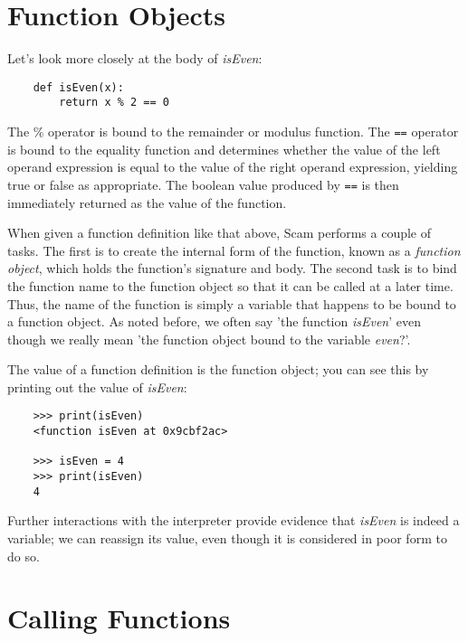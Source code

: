 \section{Function Objects}

Let's look more closely at the body of {\it isEven}:

\begin{verbatim}
    def isEven(x):
        return x % 2 == 0
\end{verbatim}

The \% operator is bound to the remainder or modulus
function. The {\tt ==} operator is bound to the equality function
and determines whether the value of the left operand
expression is equal to the value of the right operand
expression, yielding true or false as appropriate. The
{\sc boolean} value produced by {\tt ==} is then immediately returned as the
value of the function.

When given a function definition like that above, Scam
performs a couple of tasks. The first is to create the
internal form of the function, known as a {\it function object},
which holds the function's signature and body.
The second task is to bind
the function name to the function object so that it
can be called at a later time.
Thus, the name
of the function is simply a variable that happens to be
bound to a function object. As noted before, we often say
'the function {\it isEven}' even though we really mean 'the
function object bound to the variable {\it even}?'.

The value of a function definition is the
function object; you can see this by
printing out the value of {\it isEven}:

\begin{verbatim}
    >>> print(isEven)
    <function isEven at 0x9cbf2ac>

    >>> isEven = 4
    >>> print(isEven)
    4

\end{verbatim}

Further interactions with the interpreter provide evidence
that {\it isEven} is indeed a variable; we can reassign its value,
even though it is considered in poor form to do so.

\section{Calling Functions}

